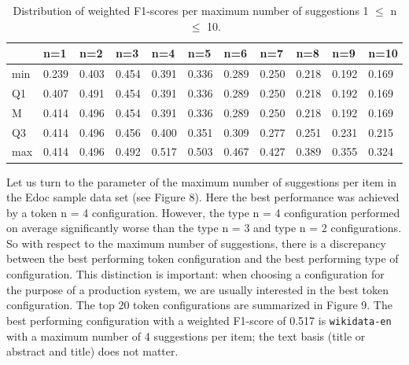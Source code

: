 \begin{table}[]
\begin{tabular}{lllllllllll}
    & n=1   & n=2   & n=3   & n=4   & n=5   & n=6   & n=7   & n=8   & n=9   & n=10  \\ \hline
min & 0.239 & 0.403 & 0.454 & 0.391 & 0.336 & 0.289 & 0.250 & 0.218 & 0.192 & 0.169 \\
Q1  & 0.407 & 0.491 & 0.454 & 0.391 & 0.336 & 0.289 & 0.250 & 0.218 & 0.192 & 0.169 \\
M   & 0.414 & 0.496 & 0.454 & 0.391 & 0.336 & 0.289 & 0.250 & 0.218 & 0.192 & 0.169 \\
Q3  & 0.414 & 0.496 & 0.456 & 0.400 & 0.351 & 0.309 & 0.277 & 0.251 & 0.231 & 0.215 \\
max & 0.414 & 0.496 & 0.492 & 0.517 & 0.503 & 0.467 & 0.427 & 0.389 & 0.355 & 0.324
\end{tabular}
\caption{Distribution of weighted F1-scores per maximum number of suggestions 1 $\leq$ n $\leq$ 10.}
\label{tab:max-number}
\end{table}

Let us turn to the parameter of the maximum number of suggestions per
item in the Edoc sample data set (see Figure 8). Here the best
performance was achieved by a token n = 4 configuration. However, the
type n = 4 configuration performed on average significantly worse than
the type n = 3 and type n = 2 configurations. So with respect to the
maximum number of suggestions, there is a discrepancy between the best
performing token configuration and the best performing type of
configuration. This distinction is important: when choosing a
configuration for the purpose of a production system, we are usually
interested in the best token configuration. The top 20 token
configurations are summarized in Figure 9. The best performing
configuration with a weighted F1-score of 0.517 is \texttt{wikidata-en}
with a maximum number of 4 suggestions per item; the text basis (title
or abstract and title) does not matter.

